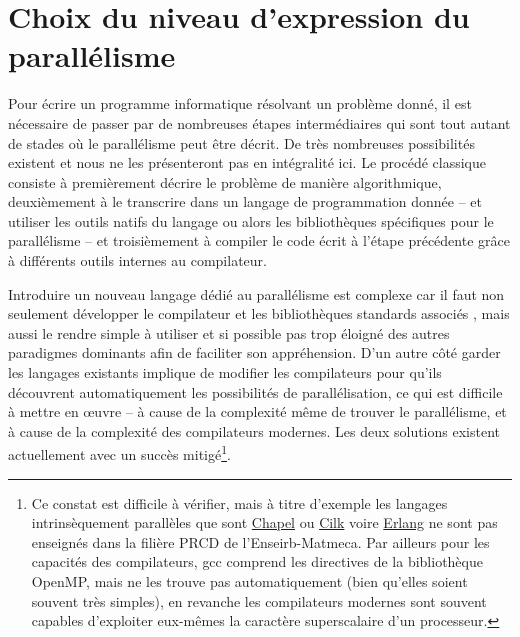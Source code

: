 \section{Choix du niveau d'expression du parallélisme}

Pour écrire un programme informatique résolvant un problème donné, il est nécessaire de passer par de nombreuses étapes intermédiaires qui sont tout autant de stades où le parallélisme peut être décrit. De très nombreuses possibilités existent et nous ne les présenteront pas en intégralité ici. Le procédé classique consiste à premièrement décrire le problème de manière algorithmique, deuxièmement à le transcrire dans un langage de programmation donnée -- et utiliser les outils natifs du langage ou alors les bibliothèques spécifiques pour le parallélisme -- et troisièmement à compiler le code écrit à l'étape précédente grâce à différents outils internes au compilateur.  

Introduire un nouveau langage dédié au parallélisme est complexe car il faut non seulement développer le compilateur et les bibliothèques standards associés , mais aussi le rendre simple à utiliser et si possible pas trop éloigné des autres paradigmes dominants afin de faciliter son appréhension. D'un autre côté garder les langages existants implique de modifier les compilateurs pour qu'ils découvrent automatiquement les possibilités de parallélisation, ce qui est difficile à mettre en œuvre -- à cause de la complexité même de trouver le parallélisme, et à cause de la complexité des compilateurs modernes. Les deux solutions existent actuellement avec un succès mitigé\footnote{Ce constat est difficile à vérifier, mais à titre d'exemple les langages intrinsèquement parallèles que sont \textsf{\href{http://chapel.cray.com/}{Chapel}} ou \textsf{\href{https://www.cilkplus.org/}{Cilk}} voire \textsf{\href{http://www.erlang.org/}{Erlang}} ne sont pas enseignés dans la filière PRCD de l'Enseirb-Matmeca. Par ailleurs pour les capacités des compilateurs, \textsf{gcc} comprend les directives de la bibliothèque OpenMP, mais ne les trouve pas automatiquement (bien qu'elles soient souvent très simples), en revanche les compilateurs modernes sont souvent capables d'exploiter eux-mêmes la caractère superscalaire d'un processeur.}.

